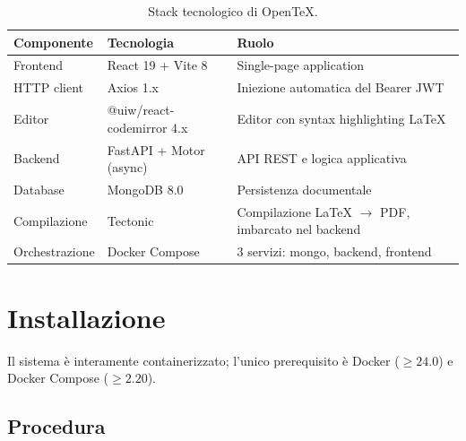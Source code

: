 \documentclass[11pt,a4paper]{article}
\begin{document}
\begin{table}[h!]
\centering
\begin{tabular}{@{}lll@{}}
\toprule
\textbf{Componente} & \textbf{Tecnologia} & \textbf{Ruolo} \\
\midrule
Frontend & React 19 + Vite 8 & Single-page application \\
HTTP client & Axios 1.x & Iniezione automatica del Bearer JWT \\
Editor & @uiw/react-codemirror 4.x & Editor con syntax highlighting LaTeX \\
Backend & FastAPI + Motor (async) & API REST e logica applicativa \\
Database & MongoDB 8.0 & Persistenza documentale \\
Compilazione & Tectonic & Compilazione LaTeX $\to$ PDF, imbarcato nel backend \\
Orchestrazione & Docker Compose & 3 servizi: mongo, backend, frontend \\
\bottomrule
\end{tabular}
\caption{Stack tecnologico di OpenTeX.}
\end{table}

\section{Installazione}

Il sistema è interamente containerizzato; l'unico prerequisito è Docker ($\geq 24.0$) e Docker Compose ($\geq 2.20$).

\subsection{Procedura}
\end{document}
